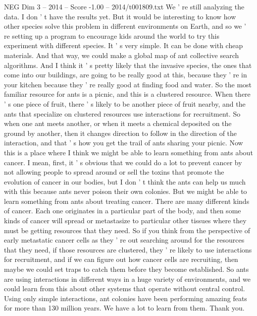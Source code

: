 \begin{textsample}{NEG Dim 3 – 2014 – Score -1.00 – 2014/t001809.txt}
We ' re still analyzing the data.
I don ' t have the results yet.
But it would be interesting to know how other species solve this problem in different environments on Earth, and so we ' re setting up a program to encourage kids around the world to try this experiment with different species.
It ' s very simple.
It can be done with cheap materials.
And that way, we could make a global map of ant collective search algorithms.
And I think it ' s pretty likely that the invasive species, the ones that come into our buildings, are going to be really good at this, because they ' re in your kitchen because they ' re really good at finding food and water.
So the most familiar resource for ants is a picnic, and this is a clustered resource.
When there ' s one piece of fruit, there ' s likely to be another piece of fruit nearby, and the ants that specialize on clustered resources use interactions for recruitment.
So when one ant meets another, or when it meets a chemical deposited on the ground by another, then it changes direction to follow in the direction of the interaction, and that ' s how you get the trail of ants sharing your picnic.
Now this is a place where I think we might be able to learn something from ants about cancer.
I mean, first, it ' s obvious that we could do a lot to prevent cancer by not allowing people to spread around or sell the toxins that promote the evolution of cancer in our bodies, but I don ' t think the ants can help us much with this because ants never poison their own colonies.
But we might be able to learn something from ants about treating cancer.
There are many different kinds of cancer.
Each one originates in a particular part of the body, and then some kinds of cancer will spread or metastasize to particular other tissues where they must be getting resources that they need.
So if you think from the perspective of early metastatic cancer cells as they ' re out searching around for the resources that they need, if those resources are clustered, they ' re likely to use interactions for recruitment, and if we can figure out how cancer cells are recruiting, then maybe we could set traps to catch them before they become established.
So ants are using interactions in different ways in a huge variety of environments, and we could learn from this about other systems that operate without central control.
Using only simple interactions, ant colonies have been performing amazing feats for more than 130 million years.
We have a lot to learn from them.
Thank you.

\end{textsample}
